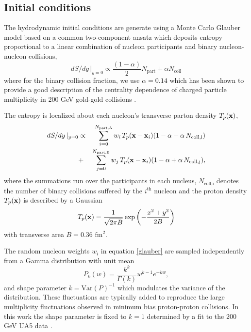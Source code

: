 \documentclass[aps,prc,reprint,amsmath,nofootinbib,superscriptaddress]{revtex4-1}
\begin{document}
\subsection{Initial conditions}

The hydrodynamic initial conditions are generate using a Monte Carlo Glauber model based on a common two-component ansatz which deposits entropy proportional to a linear combination 
of nucleon participants and binary nucleon-nucleon collisions,
\begin{equation}
 dS/dy \,\vert_{y=0} \propto \frac{(1-\alpha)}{2}N_\text{part} + \alpha N_\text{coll}
 \label{twocomponent}
\end{equation}
where for the binary collision fraction, we use $\alpha=0.14$ which has been shown to provide a good description of the centrality dependence of charged particle 
multiplicity in $200$ GeV gold-gold collisions \cite{?}.

The entropy is localized about each nucleon's transverse parton density $T_p({\bf x})$,
\begin{eqnarray}
 dS/dy \,\vert_{y=0} &\propto& \sum\limits_{i=0}^{N_\text{part,A}} w_i\, T_p({\bf x} - {\bf x}_i)(1-\alpha + \alpha\, N_\text{coll,i}) \nonumber \\
                     &+& \sum\limits_{j=0}^{N_\text{part,B}} w_j\, T_p({\bf x} - {\bf x}_i)(1-\alpha + \alpha\, N_\text{coll,j}),
 \label{glauber}
\end{eqnarray}
where the summations run over the participants in each nucleus, $N_\text{coll,i}$ denotes the number of binary collisions suffered by the $i^\text{th}$ nucleon 
and the proton density $T_p({\bf x})$ is described by a Gaussian
\begin{equation}
 T_p({\bf x}) = \frac{1}{\sqrt{2 \pi B}} \exp \left(-\frac{x^2+y^2}{2 B} \right)
\end{equation}
with transverse area $B = 0.36$ $\text{fm}^2$.

The random nucleon weights $w_i$ in equation \eqref{glauber} are sampled independently from a Gamma distribution with unit mean
\begin{equation}
 P_k(w) = \frac{k^k}{\Gamma(k)} w^{k-1} e^{-k w},
\end{equation}
and shape parameter $k = \text{Var}(P)^{-1}$ which modulates the variance of the distribution. 
These fluctuations are typically added \cite{?} to reproduce the large multiplicity fluctuations observed in minimum bias proton-proton collisions. 
In this work the shape parameter is fixed to $k=1$ determined by a fit to the $200$ GeV UA5 data \cite{?}. 
\end{document}
